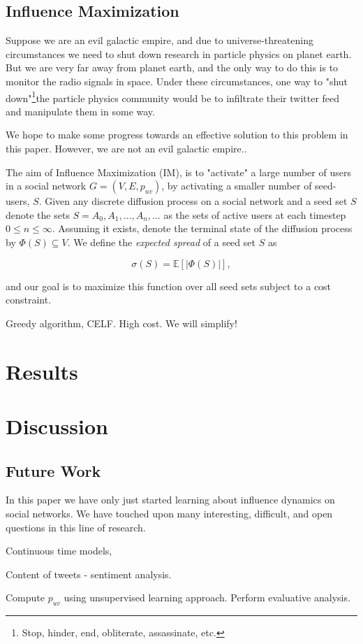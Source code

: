 \documentclass[sigconf]{acmart}
\begin{document}
\subsection{Influence Maximization}

Suppose we are an evil galactic empire, and due to universe-threatening circumstances we need to shut down research in particle physics on planet earth. But we are very far away from planet earth, and the only way to do this is to monitor the radio signals in space. Under these circumstances, one way to "shut down"\footnote{Stop, hinder, end, obliterate, assassinate, etc.}the particle physics community would be to infiltrate their twitter feed and manipulate them in some way. 

We hope to make some progress towards an effective solution to this problem in this paper. However, we are not an evil galactic empire..

The aim of Influence Maximization (IM), is to "activate" a large number of users in a social network $G = (V, E, p_{uv})$, by activating a smaller number of seed-users, $S$. Given any discrete diffusion process on a social network and a seed set $S$ denote the sets $S = A_0, A_1, \dots, A_n, \dots$ as the sets of active users at each timestep $0 \leq n \leq \infty$. Assuming it exists, denote the terminal state of the diffusion process by $\Phi(S) \subseteq V$. We define the \emph{expected spread} of a seed set $S$ as

\begin{equation}
\sigma(S) = \mathbb{E}\left[ |\Phi(S)| \right],
\end{equation}

and our goal is to maximize this function over all seed sets subject to a cost constraint. 

Greedy algorithm, CELF. High cost. We will simplify!

\section{Results} 

\section{Discussion}

\subsection{Future Work}

In this paper we have only just started learning about influence dynamics on social networks. We have touched upon many interesting, difficult, and open questions in this line of research. 

Continuous time models, 

Content of tweets - sentiment analysis. 

Compute $p_{uv}$ using unsupervised learning approach. Perform evaluative analysis. 

\nocite{*}


\end{document}
